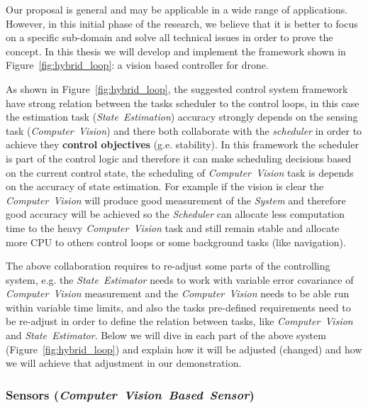 \documentclass[11pt]{article}
\begin{document}
Our proposal is general and may be applicable in a wide range of applications. However, in this initial phase of the research, we believe that it is better to focus on a specific sub-domain and solve all technical issues in order to prove the concept.
In this thesis we will develop and implement the framework shown in Figure~\ref{fig:hybrid_loop}: a vision based controller for drone. 

As shown in Figure~\ref{fig:hybrid_loop}, the suggested control system framework have strong relation between the tasks scheduler to the control loops, in this case the estimation task (\textit{State~Estimation}) accuracy strongly depends on the sensing task (\textit{Computer~Vision}) and there both collaborate with the \textit{scheduler} in order to achieve they \textbf{control objectives} (g.e. stability).
In this framework the scheduler is part of the control logic and therefore it can make scheduling decisions based on the current control state, the scheduling of \textit{Computer~Vision} task is depends on the accuracy of state estimation.
For example if the vision is clear the \textit{Computer~Vision} will produce good measurement of the \textit{System} and therefore good accuracy will be achieved so the \textit{Scheduler} can allocate less computation time to the heavy \textit{Computer~Vision} task and still remain stable and allocate more CPU to others control loops or some background tasks (like navigation).

The above collaboration requires to re-adjust some parts of the controlling system, e.g. the \textit{State~Estimator} needs to work with variable error covariance of \textit{Computer~Vision} measurement and the \textit{Computer~Vision} needs to be able run within variable time limits, and also the tasks pre-defined requirements need to be re-adjust in order to define the relation between tasks, like \textit{Computer~Vision} and \textit{State~Estimator}.
Below we will dive in each part of the above system (Figure~\ref{fig:hybrid_loop}) and explain how it will be adjusted (changed) and how we will achieve that adjustment in our demonstration.


\subsubsection{Sensors (\textit{Computer~Vision~Based~Sensor})}
\label{sec:sensors}
\end{document}
